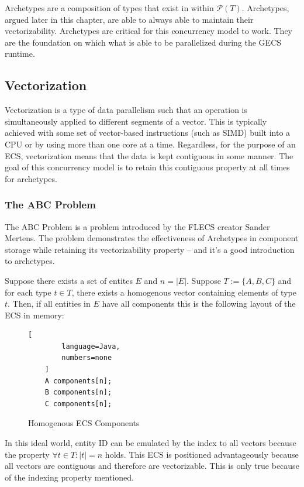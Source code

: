 Archetypes are a composition of types that exist in within $\mathcal{P}(T)$. Archetypes, argued later in this chapter, are able to always able to maintain their vectorizability. Archetypes are critical for this concurrency model to work. They are the foundation on which what is able to be parallelized during the GECS runtime. \cite{SanderMertensECS}

\subsection{Vectorization}
Vectorization is a type of data parallelism such that an operation is simultaneously applied to different segments of a vector. This is typically achieved with some set of vector-based instructions (such as SIMD) built into a CPU or by using more than one core at a time. Regardless, for the purpose of an ECS, vectorization means that the data is kept contiguous in some manner. The goal of this concurrency model is to retain this contiguous property at all times for archetypes. \cite{vectorization_wolfe_michael}

\subsubsection{The ABC Problem}


The ABC Problem is a problem introduced by the FLECS creator Sander Mertens.\cite{SanderMertensECS} The problem demonstrates the effectiveness of Archetypes in component storage while retaining its vectorizability property -- and it's a good introduction to archetypes.

Suppose there exists a set of entites $E$ and $n = |E|$. Suppose $T := \{A,B,C\}$ and for each type $t \in T$, there exists a homogenous vector containing elements of type $t$. Then, if all entities in $E$ have all components this is the following layout of the ECS in memory:

\begin{figure}[H]
    \begin{lstlisting}[
        language=Java,
        numbers=none
    ]
    A components[n];
    B components[n];
    C components[n];
    \end{lstlisting}
    \caption{Homogenous ECS Components}
    \label{code:homogenous_ecs}
\end{figure}

In this ideal world, entity ID can be emulated by the index to all vectors because the property $\forall t \in T : |t| = n$ holds. This ECS is positioned advantageously because all vectors are contiguous and therefore are vectorizable. This is only true because of the indexing property mentioned.

